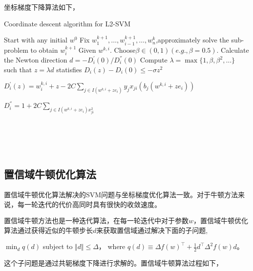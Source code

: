 \documentclass[master]{njuthesis}
\begin{document}
    坐标梯度下降算法如下，
    \begin{algorithm}
    \caption{Coordinate descent algorithm for L2-SVM}\label{CD}
    \begin{algorithmic}[1]
      \State Start with any initial $w^0$
	    \State Fix $w^{k+1}_{1},\dots,w^{k+1}_{i-1},\dots,w^{k}_{n}$,approximately solve the sub-problem to obtain $w^{k+1}_{i}$
	      \State Given $w^{k,i}$. Choose$\beta \in \left(0,1\right) \left(e.g.,\beta=0.5\right)$.
	      \State Calculate the Newton direction $d=-D^{'}_{i}\left(0\right)/D^{''}_{i}\left(0\right)$
	      \State Compute $\lambda = \max\{1,\beta,\beta^2,\dots\}$ such that $z = \lambda d$ statisfies $D_{i}\left(z\right) - D_{i}\left(0\right) \le -\sigma z^2$
          \EndProcedure
        \EndFor
      \EndFor
    \EndProcedure
    \end{algorithmic}
    \end{algorithm}

    $D^{'}_i\left(z\right) = w^{k,i}_i + z -2C \sum_{j \in I\left(w^{k,i}+ze_i\right)} y_jx_{ji}\left(b_j\left(w^{k,i}+ze_i\right)\right)$
    
    $D^{''}_i = 1 + 2C\sum_{j \in I\left(w^{k,i}+ze_i\right) x^{2}_{ji}}$
\\
\\
\\
\\
\\
    
\subsection{置信域牛顿优化算法}
   
    
    置信域牛顿优化算法解决的SVM问题与坐标梯度优化算法一致。对于牛顿方法来说，每一轮迭代的代价高同时具有很快的收敛速度。

    置信域牛顿方法也是一种迭代算法，在每一轮迭代中对于参数$w$，置信域牛顿优化算法通过获得近似的牛顿步长$d$来获取置信域通过解决下面的子问题\cite{TRON},

    $\min_{d} q\left(d\right)$ subject to $\Vert d \Vert \le \Delta$， where $q\left(d\right) \equiv \Delta f\left(w\right)^\intercal+\frac{1}{2} d^\intercal \Delta^2 f\left(w\right)d$。
    
    这个子问题是通过共轭梯度下降进行求解的。置信域牛顿算法过程如下，
    
\end{document}
